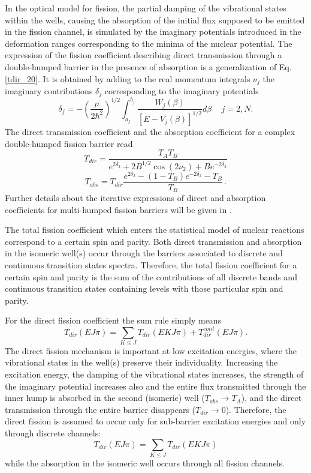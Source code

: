 In the optical model for fission, the partial damping of the vibrational
states within the wells, causing the absorption of the initial flux supposed
to be emitted in the fission channel, is simulated by the imaginary
potentials introduced in the deformation ranges corresponding to the minima
of the nuclear potential. The expression of the fission coefficient
describing direct transmission through a double-humped barrier in the
presence of absorption is a generalization of Eq.\ref{tdir_20}. It is
obtained by adding to the real momentum integrals $\nu_j$ the imaginary
contributions $\delta_j$ corresponding to the imaginary potentials \cite%
{Bhandari:79}
\begin{equation}
\delta_j=-\left( \frac{\mu}{2\hbar^{2}}\right) ^{1/2}\int_{a_{j}}^{b_{j}}%
\frac{W_j(\beta)}{[E-V_{j}(\beta)]^{1/2}}d\beta\,\quad j=2,N.
\end{equation}
The direct transmission coefficient and the absorption coefficient for a
complex double-humped fission barrier read
\begin{equation}
T_{dir}=\frac{T_{A}T_{B}}{e^{2\delta_2}+2B^{1/2}\cos
(2\nu_{2})+Be^{-2\delta_2}}  \label{tdir_2}
\end{equation}
\begin{equation}
T_{abs}=T_{dir}\frac{e^{2\delta_2}-(1-T_{B})e^{-2\delta_2}-T_{B}}{T_{B}}\,.
\label{tabs_2}
\end{equation}
Further details about the iterative expressions of direct and absorption
coefficients for multi-humped fission barriers will be given in \cite{Sin:07}%
.

The total fission coefficient which enters the statistical model of nuclear
reactions correspond to a certain spin and parity. Both direct transmission
and absorption in the isomeric well(s) occur through the barriers associated
to discrete and continuous transition states spectra. Therefore, the total
fission coefficient for a certain spin and parity is the sum of the
contributions of all discrete bands and continuous transition states
containing levels with those particular spin and parity.

For the direct fission coefficient the sum rule simply means
\begin{equation}
T_{dir}(EJ\pi)= \sum_{K\le J}T_{dir}(EKJ\pi)+ T_{dir}^{cont}(EJ\pi).
\end{equation}
The direct fission mechanism is important at low excitation energies, where
the vibrational states in the well(s) preserve their individuality.
Increasing the excitation energy, the damping of the vibrational states
increases, the strength of the imaginary potential increases also and the
entire flux transmitted through the inner hump is absorbed in the second
(isomeric) well ($T_{abs}\rightarrow T_{A}$), and the direct transmission
through the entire barrier disappears ($T_{dir}\rightarrow0$). Therefore,
the direct fission is assumed to occur only for sub-barrier excitation
energies and only through discrete channels:
\begin{equation}
T_{dir}(EJ\pi)=\sum_{K\le J}T_{dir}(EKJ\pi)  \label{tdirt}
\end{equation}
while the absorption in the isomeric well occurs through all fission
channels.


